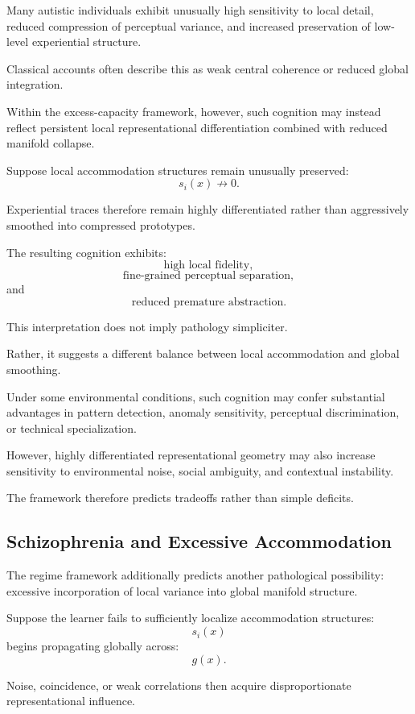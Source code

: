 \documentclass[12pt,a4paper]{article}
\begin{document}
Many autistic individuals exhibit unusually high sensitivity to local detail, reduced compression of perceptual variance, and increased preservation of low-level experiential structure.

Classical accounts often describe this as weak central coherence or reduced global integration.

Within the excess-capacity framework, however, such cognition may instead reflect persistent local representational differentiation combined with reduced manifold collapse.

Suppose local accommodation structures remain unusually preserved:
\[
s_i(x)
\not\rightarrow
0.
\]

Experiential traces therefore remain highly differentiated rather than aggressively smoothed into compressed prototypes.

The resulting cognition exhibits:
\[
\text{high local fidelity},
\]
\[
\text{fine-grained perceptual separation},
\]
and
\[
\text{reduced premature abstraction}.
\]

This interpretation does not imply pathology simpliciter.

Rather, it suggests a different balance between local accommodation and global smoothing.

Under some environmental conditions, such cognition may confer substantial advantages in pattern detection, anomaly sensitivity, perceptual discrimination, or technical specialization.

However, highly differentiated representational geometry may also increase sensitivity to environmental noise, social ambiguity, and contextual instability.

The framework therefore predicts tradeoffs rather than simple deficits.

\subsection{Schizophrenia and Excessive Accommodation}

The regime framework additionally predicts another pathological possibility:
excessive incorporation of local variance into global manifold structure.

Suppose the learner fails to sufficiently localize accommodation structures:
\[
s_i(x)
\]
begins propagating globally across:
\[
g(x).
\]

Noise, coincidence, or weak correlations then acquire disproportionate representational influence.
\end{document}

